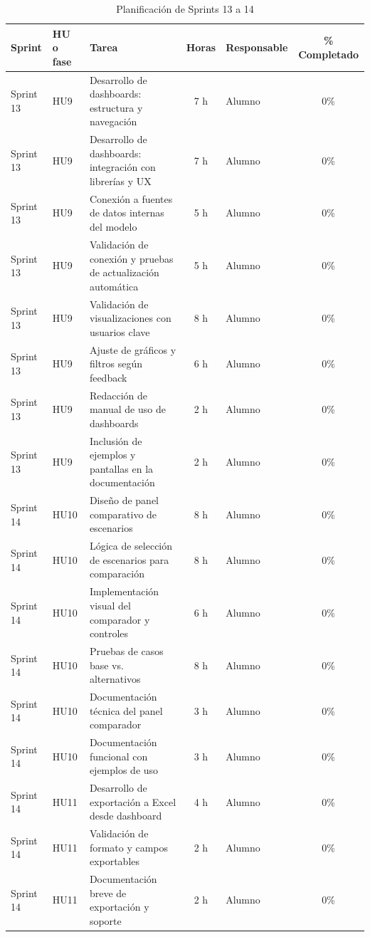 \documentclass[
11pt, %
]{charter}
\begin{document}
\begin{table}[htpb]
\centering
\caption{Planificación de Sprints 13 a 14}
\begin{tabularx}{\linewidth}{@{}|l|l|X|c|l|c|@{}}
\hline
\rowcolor[HTML]{C0C0C0}
Sprint & HU o fase & Tarea & Horas & Responsable & \% Completado \\ \hline
Sprint 13 & HU9 & Desarrollo de dashboards: estructura y navegación & 7 h & Alumno & 0\% \\ \hline
Sprint 13 & HU9 & Desarrollo de dashboards: integración con librerías y UX & 7 h & Alumno & 0\% \\ \hline
Sprint 13 & HU9 & Conexión a fuentes de datos internas del modelo & 5 h & Alumno & 0\% \\ \hline
Sprint 13 & HU9 & Validación de conexión y pruebas de actualización automática & 5 h & Alumno & 0\% \\ \hline
Sprint 13 & HU9 & Validación de visualizaciones con usuarios clave & 8 h & Alumno & 0\% \\ \hline
Sprint 13 & HU9 & Ajuste de gráficos y filtros según feedback & 6 h & Alumno & 0\% \\ \hline
Sprint 13 & HU9 & Redacción de manual de uso de dashboards & 2 h & Alumno & 0\% \\ \hline
Sprint 13 & HU9 & Inclusión de ejemplos y pantallas en la documentación & 2 h & Alumno & 0\% \\ \hline
\hline
Sprint 14 & HU10 & Diseño de panel comparativo de escenarios & 8 h & Alumno & 0\% \\ \hline
Sprint 14 & HU10 & Lógica de selección de escenarios para comparación & 8 h & Alumno & 0\% \\ \hline
Sprint 14 & HU10 & Implementación visual del comparador y controles & 6 h & Alumno & 0\% \\ \hline
Sprint 14 & HU10 & Pruebas de casos base vs. alternativos & 8 h & Alumno & 0\% \\ \hline
Sprint 14 & HU10 & Documentación técnica del panel comparador & 3 h & Alumno & 0\% \\ \hline
Sprint 14 & HU10 & Documentación funcional con ejemplos de uso & 3 h & Alumno & 0\% \\ \hline
Sprint 14 & HU11 & Desarrollo de exportación a Excel desde dashboard & 4 h & Alumno & 0\% \\ \hline
Sprint 14 & HU11 & Validación de formato y campos exportables & 2 h & Alumno & 0\% \\ \hline
Sprint 14 & HU11 & Documentación breve de exportación y soporte & 2 h & Alumno & 0\% \\ \hline
\end{tabularx}
\end{table}
\end{document}

